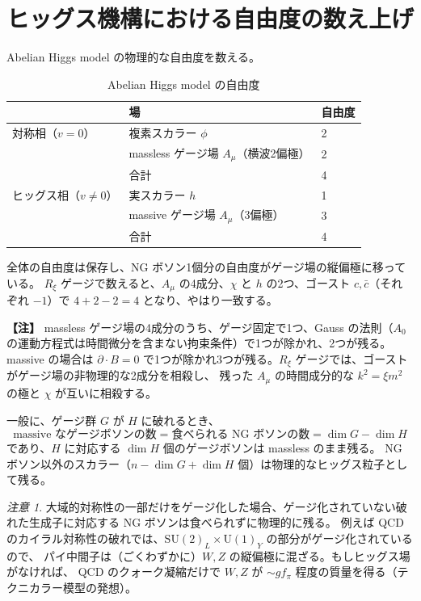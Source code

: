 \documentclass[uplatex,dvipdfmx,a4paper,11pt,openany]{jsbook}
\newenvironment{note}{\vspace{1ex}\par\footnotesize\noindent\textbf{【注】}}{\par\vspace{1ex}}
\numberwithin{equation}{chapter}
\theoremstyle{definition}
\theoremstyle{plain}
\theoremstyle{remark}
\newtheorem{remark}{注意}[chapter]
\newcommand{\SU}{\mathrm{SU}}
\newcommand{\U}{\mathrm{U}}
\begin{document}
\section{ヒッグス機構における自由度の数え上げ}
\label{sec:Higgs-counting}
Abelian Higgs model の物理的な自由度を数える。
\begin{table}[htbp]
\centering
\caption{Abelian Higgs model の自由度}
\label{tab:abelian-dof}
\begin{tabular}{lll}
\toprule
 & 場 & 自由度\\
\midrule
対称相（$v=0$） & 複素スカラー $\phi$ & 2\\
 & massless ゲージ場 $A_\mu$（横波2偏極） & 2\\
 & 合計 & 4\\
\midrule
ヒッグス相（$v\ne0$） & 実スカラー $h$ & 1\\
 & massive ゲージ場 $A_\mu$（3偏極） & 3\\
 & 合計 & 4\\
\bottomrule
\end{tabular}
\end{table}
全体の自由度は保存し、NG ボソン1個分の自由度がゲージ場の縦偏極に移っている。
$R_\xi$ ゲージで数えると、$A_\mu$ の4成分、$\chi$ と $h$ の2つ、ゴースト $c,\bar c$（それぞれ $-1$）で
$4+2-2=4$ となり、やはり一致する。
\begin{note}
massless ゲージ場の4成分のうち、ゲージ固定で1つ、Gauss の法則（$A_0$ の運動方程式は時間微分を含まない拘束条件）で1つが除かれ、2つが残る。
massive の場合は $\partial\cdot B=0$ で1つが除かれ3つが残る。$R_\xi$ ゲージでは、ゴーストがゲージ場の非物理的な2成分を相殺し、
残った $A_\mu$ の時間成分的な $k^2=\xi m^2$ の極と $\chi$ が互いに相殺する。
\end{note}
一般に、ゲージ群 $G$ が $H$ に破れるとき、
\begin{equation}
\text{massive なゲージボソンの数}=\text{食べられる NG ボソンの数}=\dim G-\dim H
\label{eq:massive-gauge-count}
\end{equation}
であり、$H$ に対応する $\dim H$ 個のゲージボソンは massless のまま残る。
NG ボソン以外のスカラー（$n-\dim G+\dim H$ 個）は物理的なヒッグス粒子として残る。
\begin{remark}
大域的対称性の一部だけをゲージ化した場合、ゲージ化されていない破れた生成子に対応する NG ボソンは食べられずに物理的に残る。
例えば QCD のカイラル対称性の破れでは、$\SU(2)_L\times\U(1)_Y$ の部分がゲージ化されているので、
パイ中間子は（ごくわずかに）$W,Z$ の縦偏極に混ざる。もしヒッグス場がなければ、
QCD のクォーク凝縮だけで $W,Z$ が $\sim gf_\pi$ 程度の質量を得る（テクニカラー模型の発想）。
\end{remark}
\end{document}
